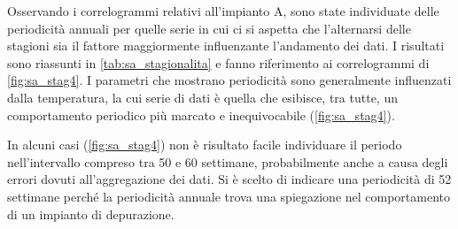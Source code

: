 Osservando i correlogrammi relativi all'impianto A, sono state individuate delle periodicità annuali per quelle serie in cui ci si aspetta che l'alternarsi delle stagioni sia il fattore maggiormente influenzante l'andamento dei dati. I risultati sono riassunti in \autoref{tab:sa_stagionalita} e fanno riferimento ai correlogrammi di \autoref{fig:sa_stag4}.
I parametri che mostrano periodicità sono generalmente influenzati dalla temperatura, la cui serie di dati è quella che esibisce, tra tutte, un comportamento periodico più marcato e inequivocabile (\autoref{fig:sa_stag4}).

In alcuni casi (\autoref{fig:sa_stag4}) non è risultato facile individuare il periodo nell'intervallo compreso tra 50 e 60 settimane, probabilmente anche a causa degli errori dovuti all'aggregazione dei dati. Si è scelto di indicare una periodicità di 52 settimane perché la periodicità annuale trova una spiegazione nel comportamento di un impianto di depurazione.

